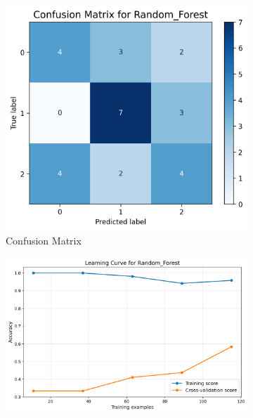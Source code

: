 \documentclass[10pt]{article}
\begin{document}
    \begin{figure}[!ht]
        \begin{subfigure}{0.33\textwidth}
            \centering
            \includegraphics[width=\textwidth]{code/ResultsMainAugZip/plots/Block1_Tree_Based_Experiment_II/confusion_matrix_Random_Forest.png}
            \caption{Confusion Matrix}
        \end{subfigure}
        \begin{subfigure}{0.33\textwidth}
            \centering
            \includegraphics[width=\textwidth]{code/ResultsMainAugZip/plots/Block1_Tree_Based_Experiment_II/learning_curve_Random_Forest.png}

\end{subfigure}
\end{figure}
\end{document}
